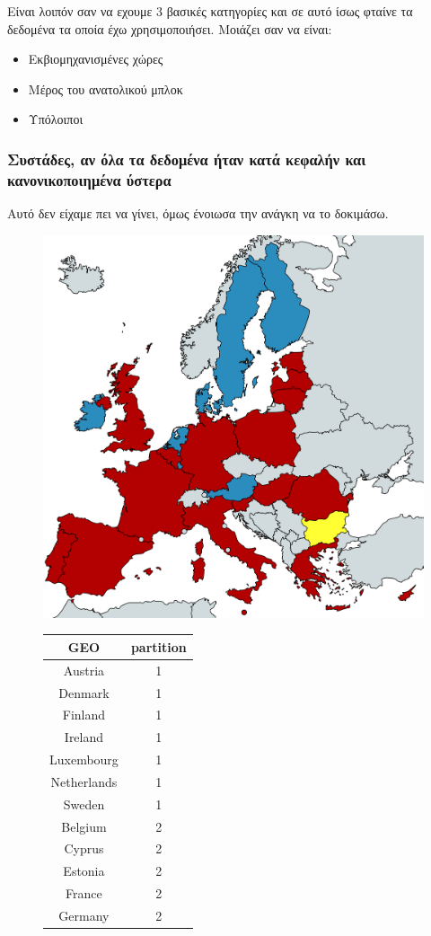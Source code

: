 \documentclass[a4paper,twoside,10pt]{article}
\begin{document}
Είναι λοιπόν σαν να εχουμε 3 βασικές κατηγορίες και σε αυτό ίσως φταίνε τα δεδομένα τα οποία έχω χρησιμοποιήσει. Μοιάζει σαν να είναι:
\begin{itemize}
	\item Εκβιομηχανισμένες χώρες
	\item Μέρος του ανατολικού μπλοκ
	\item Υπόλοιποι
\end{itemize}
\subsubsection{Συστάδες, αν όλα τα δεδομένα ήταν κατά κεφαλήν και κανονικοποιημένα ύστερα}
Αυτό δεν είχαμε πει να γίνει, όμως ένοιωσα την ανάγκη να το δοκιμάσω.

\begin{figure}[!ht]
	\centering
	\includegraphics[width=0.65\linewidth]{images/Clustering_per_capita}
	\qquad
	\begin{tabular}[b]{|cc|}
		\hline
GEO & partition \\
\hline
Austria &   1 \\
Denmark &   1 \\ 
Finland &   1 \\
Ireland &   1 \\
Luxembourg &   1 \\
Netherlands &   1 \\
Sweden &   1 \\ \hline
Belgium &   2 \\
Cyprus &   2 \\
Estonia &   2 \\ 
France &   2 \\
Germany &   2 \\

\end{tabular}
\end{figure}
\end{document}
